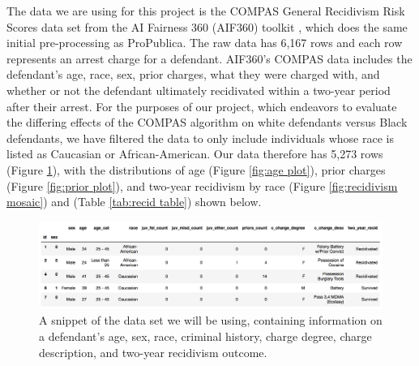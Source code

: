 \documentclass[water,article,submit,moreauthors,pdftex]{mdpi}
\begin{document}
The data we are using for this project is the COMPAS General Recidivism
Risk Scores data set from the AI Fairness 360 (AIF360) toolkit
\citep{aif360-oct-2018}, which does the same initial pre-processing as
ProPublica. The raw data has 6,167 rows and each row represents an
arrest charge for a defendant. AIF360's COMPAS data includes the
defendant's age, race, sex, prior charges, what they were charged with,
and whether or not the defendant ultimately recidivated within a
two-year period after their arrest. For the purposes of our project,
which endeavors to evaluate the differing effects of the COMPAS
algorithm on white defendants versus Black defendants, we have filtered
the data to only include individuals whose race is listed as Caucasian
or African-American. Our data therefore has 5,273 rows (Figure
\ref{fig:table snip}), with the distributions of age (Figure
\ref{fig:age plot}), prior charges (Figure \ref{fig:prior plot}), and
two-year recidivism by race (Figure \ref{fig:recidivism mosaic}) and
(Table \ref{tab:recid table}) shown below.

\begin{figure}

{\centering \includegraphics[width=1\linewidth]{../images/table_snippet} 

}

\caption{A snippet of the data set we will be using, containing information on a defendant's age, sex, race, criminal history, charge degree, charge description, and two-year recidivism outcome.}\label{fig:table snip}
\end{figure}
\end{document}
